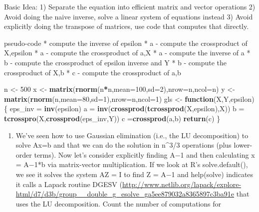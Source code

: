 \documentclass[]{article}
\newenvironment{Shaded}{\begin{snugshade}}{\end{snugshade}}
\newcommand{\ControlFlowTok}[1]{\textcolor[rgb]{0.13,0.29,0.53}{\textbf{#1}}}
\newcommand{\DataTypeTok}[1]{\textcolor[rgb]{0.13,0.29,0.53}{#1}}
\newcommand{\DecValTok}[1]{\textcolor[rgb]{0.00,0.00,0.81}{#1}}
\newcommand{\KeywordTok}[1]{\textcolor[rgb]{0.13,0.29,0.53}{\textbf{#1}}}
\newcommand{\NormalTok}[1]{#1}
\newcommand{\OperatorTok}[1]{\textcolor[rgb]{0.81,0.36,0.00}{\textbf{#1}}}
\newcommand{\StringTok}[1]{\textcolor[rgb]{0.31,0.60,0.02}{#1}}
\providecommand{\tightlist}{%
  \setlength{\itemsep}{0pt}\setlength{\parskip}{0pt}}
\begin{document}
Basic Idea: 1) Separate the equation into efficient matrix and vector
operations 2) Avoid doing the naive inverse, solve a linear system of
equations instead 3) Avoid explicitly doing the transpose of matrices,
use code that computes that directly.

pseudo-code * compute the inverse of epsilon * a - compute the
crossproduct of X,epsilon * a - compute the crossproduct of a,X * a -
compute the inverse of a * b - compute the crossproduct of epsilon
inverse and Y * b - compute the crossproduct of X,b * c - compute the
crossproduct of a,b

\begin{Shaded}
\begin{Highlighting}[]
\NormalTok{n <-}\StringTok{ }\DecValTok{500}
\NormalTok{x <-}\StringTok{ }\KeywordTok{matrix}\NormalTok{(}\KeywordTok{rnorm}\NormalTok{(n}\OperatorTok{*}\NormalTok{n,}\DataTypeTok{mean=}\DecValTok{100}\NormalTok{,}\DataTypeTok{sd=}\DecValTok{2}\NormalTok{),}\DataTypeTok{nrow=}\NormalTok{n,}\DataTypeTok{ncol=}\NormalTok{n)}
\NormalTok{y <-}\StringTok{ }\KeywordTok{matrix}\NormalTok{(}\KeywordTok{rnorm}\NormalTok{(n,}\DataTypeTok{mean=}\DecValTok{80}\NormalTok{,}\DataTypeTok{sd=}\DecValTok{1}\NormalTok{),}\DataTypeTok{nrow=}\NormalTok{n,}\DataTypeTok{ncol=}\DecValTok{1}\NormalTok{)}
\NormalTok{gls <-}\StringTok{ }\ControlFlowTok{function}\NormalTok{(X,Y,epsilon) \{ }
\NormalTok{  eps_inv =}\StringTok{ }\KeywordTok{inv}\NormalTok{(epsilon)}
\NormalTok{  a =}\StringTok{ }\KeywordTok{inv}\NormalTok{(}\KeywordTok{crossprod}\NormalTok{(}\KeywordTok{tcrossprod}\NormalTok{(X,epsilon),X))}
\NormalTok{  b =}\StringTok{ }\KeywordTok{tcrosspro}\NormalTok{(X,}\KeywordTok{crossprod}\NormalTok{(eps_inv,Y))}
\NormalTok{  c =}\KeywordTok{crossprod}\NormalTok{(a,b)}
  \KeywordTok{return}\NormalTok{(c)}
\NormalTok{\}}
\end{Highlighting}
\end{Shaded}

\begin{enumerate}
\def\labelenumi{\arabic{enumi}.}
\setcounter{enumi}{3}
\tightlist
\item
  We've seen how to use Gaussian elimination (i.e., the LU
  decomposition) to solve Ax=b and that we can do the solution in
  n\^{}3/3 operations (plus lower-order terms). Now let's consider
  explicitly finding A−1 and then calculating x = A−1*b via
  matrix-vector multiplication. If we look at R's solve.default(), we
  see it solves the system AZ = I to find Z = A−1 and help(solve)
  indicates it calls a Lapack routine DGESV
  (\url{http://www.netlib.org/lapack/explore-html/d7/d3b/group__double_g_esolve_ga5ee879032a8365897c3ba91e}
  that uses the LU decomposition. Count the number of computations for
\end{enumerate}
\end{document}
